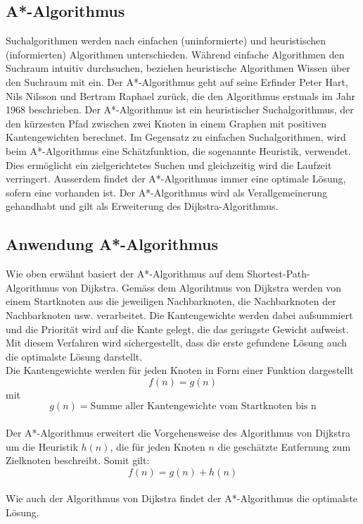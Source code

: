\subsection{A*-Algorithmus}
Suchalgorithmen werden nach einfachen (uninformierte) und heuristischen (informierten) Algorithmen unterschieden. Während einfache Algorithmen den Suchraum intuitiv durchsuchen, beziehen heuristische Algorithmen Wissen über den Suchraum mit ein.
Der A*-Algorithmus geht auf seine Erfinder Peter Hart, Nils Nilsson und Bertram Raphael zurück, die den Algorithmus erstmals im Jahr 1968 beschrieben.
Der A*-Algorithmus ist ein heuristischer Suchalgorithmus, der den kürzesten Pfad zwischen zwei Knoten in einem Graphen mit positiven Kantengewichten berechnet.
Im Gegensatz zu einfachen Suchalgorithmen, wird beim A*-Algorithmus eine Schätzfunktion, die sogenannte Heuristik, verwendet. Dies ermöglicht ein zielgerichtetes Suchen und gleichzeitig wird die Laufzeit verringert.
Ausserdem findet der A*-Algorithmus immer eine optimale Lösung, sofern eine vorhanden ist.
Der A*-Algorithmus wird als Verallgemeinerung gehandhabt und gilt als Erweiterung des Dijkstra-Algorithmus.

\subsection{Anwendung A*-Algorithmus}
Wie oben erwähnt basiert der A*-Algorithmus auf dem Shortest-Path-Algorithmus von Dijkstra. Gemäss dem Algorihtmus von Dijkstra werden von einem Startknoten aus die jeweiligen Nachbarknoten, die Nachbarknoten der Nachbarknoten usw. verarbeitet. Die Kantengewichte werden dabei aufsummiert und die Priorität wird auf die Kante gelegt, die das geringste Gewicht aufweist. Mit diesem Verfahren wird sichergestellt, dass die erste gefundene Lösung auch die optimalste Lösung darstellt.\\

Die Kantengewichte werden für jeden Knoten in Form einer Funktion dargestellt
\begin{equation}f(n)=g(n)\end{equation} mit
\begin{equation}g(n)=\text{Summe aller Kantengewichte vom Startknoten bis n}\end{equation}\\
Der A*-Algorithmus erweitert die Vorgehensweise des Algorithmus von Dijkstra um die Heuristik $h(n)$, die für jeden Knoten $n$ die geschätzte Entfernung zum Zielknoten beschreibt.
Somit gilt:
\begin{equation}f(n)=g(n)+h(n)\end{equation}\\
Wie auch der Algorithmus von Dijkstra findet der A*-Algorithmus die optimalste Lösung.

